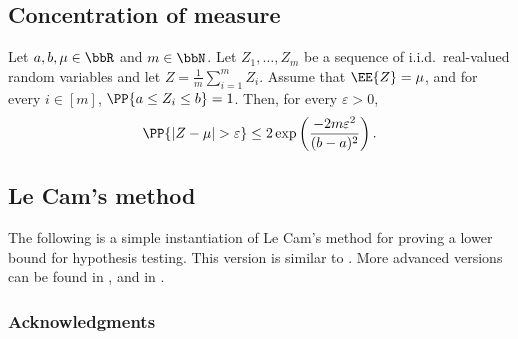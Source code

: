 \documentclass{toc}
\begin{document}
%
\subsection{Concentration of measure}  %

\begin{theorem}
	\label{theorem:hoeffding}
	Let $a,b,\mu \in \bbR$ and $m \in \bbN$. Let $Z_1, \dots, Z_m$ be a sequence of i.i.d.\ real-valued random variables and let $Z=\frac{1}{m} \sum_{i=1}^m Z_i$. Assume that $\EE{Z}=\mu$, and for every $i \in [m]$, $\PP{a \leq Z_i \leq b}=1$. Then, for every $\varepsilon>0$,
	\[
		\PP{\left|Z-\mu\right|>\varepsilon} \leq 2 \exp\left(\frac{-2 m \varepsilon^2}{(b-a)^2}\right).
	\]
\end{theorem}

%
\subsection{Le Cam's method}  %

The following is a simple instantiation of Le Cam's method for proving a lower bound for hypothesis testing. This version is similar to
%
\cite[Proposition 2.3.1]{stats311_notes}.  %
More advanced versions can be found in
%
\cite[Lemma 1]{yu1997assouad},  %
and in %
\cite[Chapter 16]{lecam1986asymptotic}.  %

%


\subsubsection*{Acknowledgments}
\end{document}
